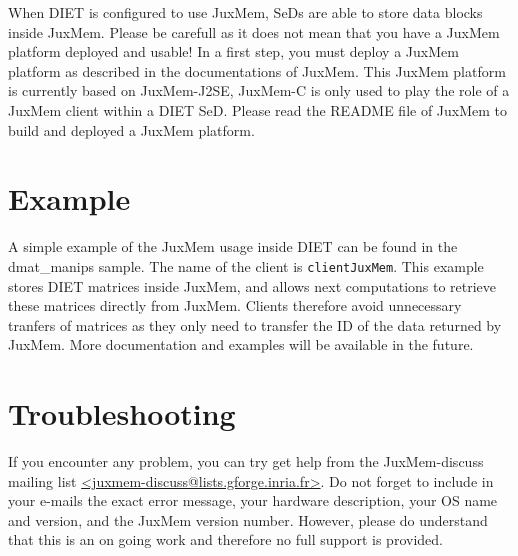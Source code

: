 When DIET is configured to use JuxMem, SeDs are able to store data
blocks inside JuxMem. Please be carefull as it does not mean that you
have a JuxMem platform deployed and usable!  In a first step, you must
deploy a JuxMem platform as described in the documentations of
JuxMem. This JuxMem platform is currently based on JuxMem-J2SE,
JuxMem-C is only used to play the role of a JuxMem client within a
DIET SeD. Please read the README file of JuxMem to build and deployed
a JuxMem platform.

\section{Example}

A simple example of the JuxMem usage inside DIET can be found in the
dmat\_manips sample. The name of the client is
\texttt{clientJuxMem}. This example stores DIET matrices inside JuxMem, 
and allows next computations to retrieve these matrices directly from
JuxMem. Clients therefore avoid unnecessary tranfers of matrices as
they only need to transfer the ID of the data returned by JuxMem. More
documentation and examples will be available in the future.

\section{Troubleshooting}

If you encounter any problem, you can try get help from the
JuxMem-discuss mailing list
\url{<juxmem-discuss@lists.gforge.inria.fr>}. Do not forget to include
in your e-mails the exact error message, your hardware description,
your OS name and version, and the JuxMem version number.  However,
please do understand that this is an on going work and therefore no
full support is provided.
